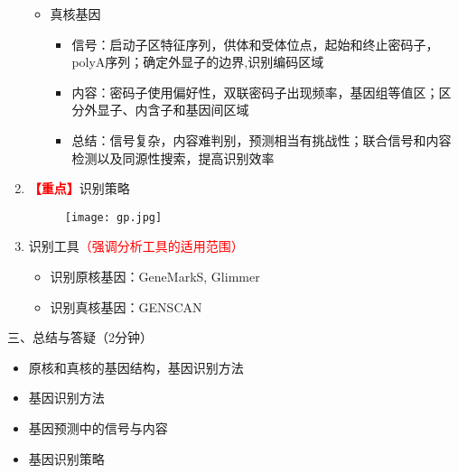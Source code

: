 \documentclass{TIJMUjiaoanLL}
\begin{document}
\begin{enumerate}
\otherTail
\newpage
\otherHeader


    \begin{itemize}
      \item 真核基因
       \begin{itemize}
        \item 信号：启动子区特征序列，供体和受体位点，起始和终止密码子，polyA序列；确定外显子的边界,识别编码区域
        \item 内容：密码子使用偏好性，双联密码子出现频率，基因组等值区；区分外显子、内含子和基因间区域
        \item 总结：信号复杂，内容难判别，预测相当有挑战性；联合信号和内容检测以及同源性搜索，提高识别效率
       \end{itemize}
    \end{itemize}
  \item \textcolor{red}{\textbf{【重点】}}识别策略
    \begin{figure}[h]
      \centering
      \texttt{[image: gp.jpg]}
    \end{figure}
  \item 识别工具\textcolor{red}{（强调分析工具的适用范围）}
    \begin{itemize}
      \item 识别原核基因：GeneMarkS, Glimmer
      \item 识别真核基因：GENSCAN
    \end{itemize}
\end{enumerate}

\vspace*{0.2cm}
\noindent
三、总结与答疑（2分钟）
\begin{itemize}
  \item 原核和真核的基因结构，基因识别方法
  \item 基因识别方法
  \item 基因预测中的信号与内容
  \item 基因识别策略
\end{itemize}


\otherTail
\end{document}
